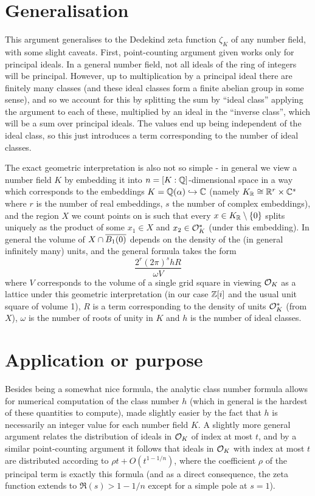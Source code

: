 \documentclass[11pt]{article}
\begin{document}
\section{Generalisation}
This argument generalises to the Dedekind zeta function $\zeta_K$ of any number field, with some slight caveats. First, point-counting argument given works only for principal ideals. In a general number field, not all ideals of the ring of integers will be principal. However, up to multiplication by a principal ideal there are finitely many classes (and these ideal classes form a finite abelian group in some sense), and so we account for this by splitting the sum by ``ideal class'' applying the argument to each of these, multiplied by an ideal in the ``inverse class'', which will be a sum over principal ideals. The values end up being independent of the ideal class, so this just introduces a term corresponding to the number of ideal classes.

The exact geometric interpretation is also not so simple - in general we view a number field $K$ by embedding it into $n = [K : \mathbb{Q}]$-dimensional space in a way which corresponds to the embeddings $K = \mathbb{Q}(\alpha) \hookrightarrow \mathbb{C}$ (namely $K_{\mathbb{R}} \cong \mathbb{R}^r \times \mathbb{C}^s$ where $r$ is the number of real embeddings, $s$ the number of complex embeddings), and the region $X$ we count points on is such that every $x \in K_{\mathbb{R}} \setminus \left\{  0  \right\}$ splits uniquely as the product of some $x_1 \in X$ and $x_2 \in \mathcal{O}_K^*$ (under this embedding). In general the volume of $X \cap \overline{B_1(0)}$ depends on the density of the (in general infinitely many) units, and the general formula takes the form
$$
    \frac{2^r(2\pi)^s hR}{\omega V}
$$
where $V$ corresponds to the volume of a single grid square in viewing $\mathcal{O}_K$ as a lattice under this geometric interpretation (in our case $\mathbb{Z}[i]$ and the usual unit square of volume 1), $R$ is a term corresponding to the density of units $\mathcal{O}_K^*$ (from $X$), $\omega$ is the number of roots of unity in $K$ and $h$ is the number of ideal classes.
\section{Application or purpose}
Besides being a somewhat nice formula, the analytic class number formula allows for numerical computation of the class number $h$ (which in general is the hardest of these quantities to compute), made slightly easier by the fact that $h$ is necessarily an integer value for each number field $K$. A slightly more general argument relates the distribution of ideals in $\mathcal{O}_K$ of index at most $t$, and by a similar point-counting argument it follows that ideals in $\mathcal{O}_K$ with index at most $t$ are distributed according to $\rho t + O(t^{1 - 1/n})$, where the coefficient $\rho$ of the principal term is exactly this formula (and as a direct consequence, the zeta function extends to $\Re(s) > 1 - 1/n$ except for a simple pole at $s = 1$).
\end{document}
